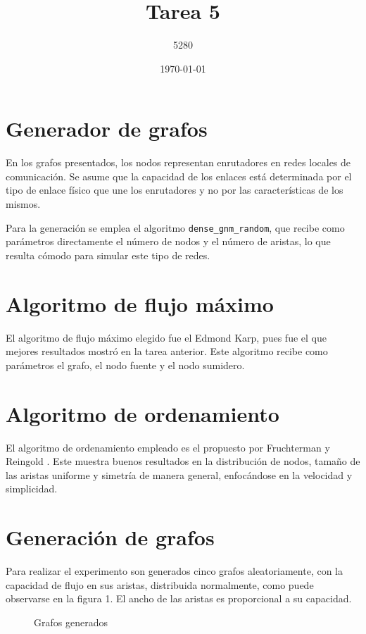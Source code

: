 \documentclass{article}
\title{
Tarea 5
}
\author{5280}
\date{\today}
\begin{document}
\maketitle

\section*{Generador de grafos} 

En los grafos presentados, los nodos representan enrutadores en redes locales de comunicación. Se asume que la capacidad de los enlaces está determinada por el tipo de enlace físico que une los  enrutadores y no por las características de los mismos. 

Para la generación se emplea el algoritmo \texttt{dense\_gnm\_random}, que recibe como parámetros directamente el número de nodos y el número de aristas, lo que resulta cómodo para simular este tipo de redes.

\section*{Algoritmo de flujo máximo}

El algoritmo de flujo máximo elegido fue el Edmond Karp, pues fue el que mejores resultados mostró en la tarea anterior. Este algoritmo recibe como parámetros el grafo, el nodo fuente y el nodo sumidero.

\section*{Algoritmo de ordenamiento}

El algoritmo de ordenamiento empleado es el propuesto por Fruchterman y Reingold \citep{fruchterman1991graph}. Este muestra buenos resultados en la distribución de nodos, tamaño de las aristas uniforme y simetría de manera general, enfocándose en la velocidad y simplicidad.

\section*{Generación de grafos}

Para realizar el experimento son generados cinco grafos aleatoriamente, con la capacidad de flujo en sus aristas, distribuida normalmente, como puede observarse en la figura 1. El ancho de las aristas es proporcional a su capacidad. 

\begin{figure}[htbp]
\centering
{}
\caption{Grafos generados}
\label{Grafos} 
\end{figure}
\end{document}
